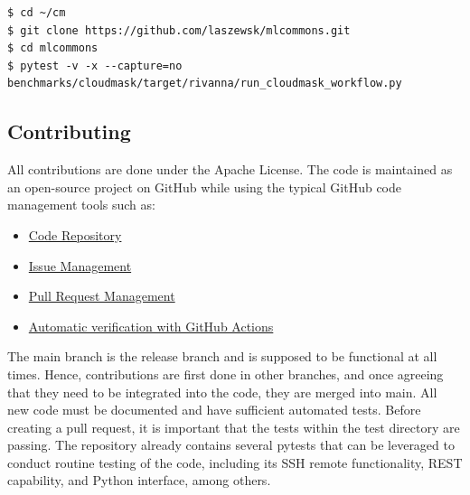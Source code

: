 \documentclass[sigplan,screen]{acmart}
\newcommand{\FILE}[1]{}
\begin{document}
\begin{verbatim}
$ cd ~/cm
$ git clone https://github.com/laszewsk/mlcommons.git
$ cd mlcommons
$ pytest -v -x --capture=no benchmarks/cloudmask/target/rivanna/run_cloudmask_workflow.py
\end{verbatim}


% 

\FILE{contributing.tex}

\subsection{Contributing}\label{contributing}

All contributions are done under the Apache License. The code is
maintained as an open-source project on GitHub while using the typical
GitHub code management tools such as:

\begin{itemize}
\item
  \href{https://github.com/cloudmesh/cloudmesh-cc}{Code Repository}
\item
  \href{https://github.com/cloudmesh/cloudmesh-cc/issues}{Issue Management}
\item
  \href{https://github.com/cloudmesh/cloudmesh-cc/pulls}{Pull Request Management}
\item
  \href{https://github.com/cloudmesh/cloudmesh-cc/actions}{Automatic verification with GitHub Actions}
\end{itemize}

The main branch is the release branch and is supposed to be functional
at all times. Hence, contributions are first done in other branches,
and once agreeing that they need to be integrated into the code, they
are merged into main. All new code must be documented and have
sufficient automated tests. Before creating a pull request, it is
important that the tests within the test directory are passing. The
repository already contains several pytests that can be leveraged to
conduct routine testing of the code, including its SSH remote
functionality, REST capability, and Python interface, among others.
\end{document}
